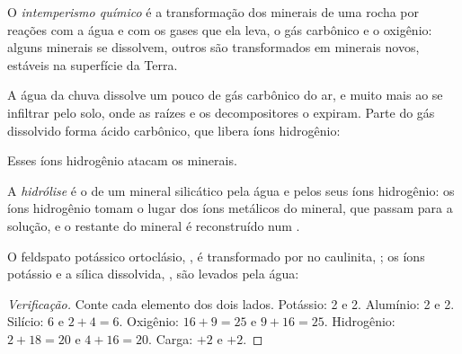 \begin{definition}\label{def:g10:soil-formation:chemical-weathering}
O \emph{intemperismo químico}
é a transformação dos minerais de uma rocha por reações com a água e com os
gases que ela leva, o gás carbônico e o oxigênio: alguns minerais se
dissolvem, outros são transformados em minerais novos, estáveis na
superfície da Terra.
\end{definition}

A água da chuva dissolve um pouco de gás carbônico do ar, e muito mais ao se
infiltrar pelo solo, onde as raízes e os decompositores o expiram. Parte do
gás dissolvido forma ácido carbônico, que libera íons hidrogênio:
\begin{center}
\end{center}
Esses íons hidrogênio atacam os minerais.

\begin{definition}[Hidrólise]\label{def:g10:soil-formation:hydrolysis}
A \emph{hidrólise} é o  de um
mineral silicático pela água e pelos seus íons hidrogênio: os íons hidrogênio
tomam o lugar dos íons metálicos do mineral, que passam para a solução, e o
restante do mineral é reconstruído num .
\end{definition}

\begin{proposition}\label{prop:g10:soil-formation:hydrolysis}
O feldspato potássico ortoclásio, , é transformado por 
no  caulinita, ; os íons potássio e a sílica
dissolvida, , são levados pela água:
\begin{center}
\end{center}
\end{proposition}

\begin{proof}[Verificação]
Conte cada elemento dos dois lados. Potássio: 2 e 2. Alumínio: 2 e 2.
Silício: 6 e $2 + 4 = 6$. Oxigênio: $16 + 9 = 25$ e $9 + 16 = 25$.
Hidrogênio: $2 + 18 = 20$ e $4 + 16 = 20$. Carga: $+2$ e $+2$.
\end{proof}

